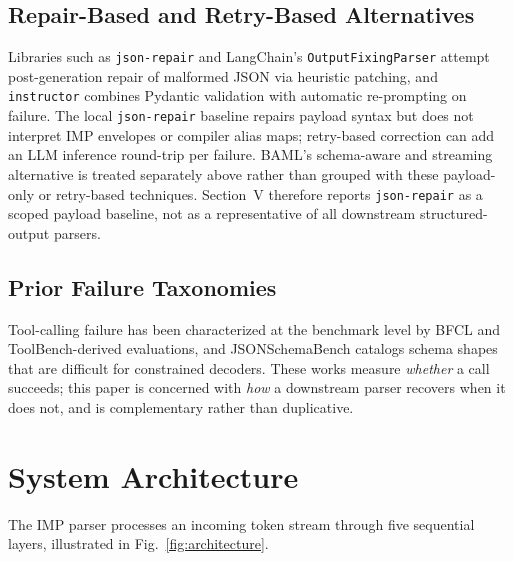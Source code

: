 \documentclass[conference]{IEEEtran}
\begin{document}
\subsection{Repair-Based and Retry-Based Alternatives}

Libraries such as \texttt{json-repair} \cite{jsonrepair} and LangChain's
\texttt{OutputFixingParser} attempt post-generation repair of malformed
JSON via heuristic patching, and \texttt{instructor} \cite{instructor}
combines Pydantic validation with automatic re-prompting on failure.
The local \texttt{json-repair} baseline repairs payload syntax but does not
interpret IMP envelopes or compiler alias maps; retry-based correction can add
an LLM inference round-trip per failure. BAML's schema-aware and streaming
alternative is treated separately above rather than grouped with these
payload-only or retry-based techniques. Section~V therefore reports
\texttt{json-repair} as a scoped payload baseline, not as a representative of
all downstream structured-output parsers.

\subsection{Prior Failure Taxonomies}

Tool-calling failure has been characterized at the benchmark level by
BFCL \cite{bfcl} and ToolBench-derived evaluations, and JSONSchemaBench
\cite{jsonschemabench} catalogs schema shapes that are difficult for
constrained decoders. These works measure \emph{whether} a call
succeeds; this paper is concerned with \emph{how} a downstream parser
recovers when it does not, and is complementary rather than duplicative.

\section{System Architecture}

The IMP parser processes an incoming token stream through five
sequential layers, illustrated in Fig.~\ref{fig:architecture}.
\end{document}
